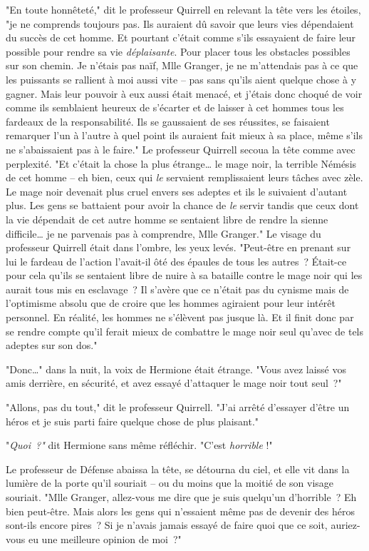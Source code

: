"En toute honnêteté," dit le professeur Quirrell en relevant la tête vers les étoiles, "je ne comprends toujours pas. Ils auraient dû savoir que leurs vies dépendaient du succès de cet homme. Et pourtant c'était comme s'ils essayaient de faire leur possible pour rendre sa vie \emph{déplaisante}. Pour placer tous les obstacles possibles sur son chemin. Je n'étais pas naïf, Mlle Granger, je ne m'attendais pas à ce que les puissants se rallient à moi aussi vite -- pas sans qu'ils aient quelque chose à y gagner. Mais leur pouvoir à eux aussi était menacé, et j'étais donc choqué de voir comme ils semblaient heureux de s'écarter et de laisser à cet hommes tous les fardeaux de la responsabilité. Ils se gaussaient de ses réussites, se faisaient remarquer l'un à l'autre à quel point ils auraient fait mieux à sa place, même s'ils ne s'abaissaient pas à le faire." Le professeur Quirrell secoua la tête comme avec perplexité. "Et c'était la chose la plus étrange… le mage noir, la terrible Némésis de cet homme -- eh bien, ceux qui \emph{le} servaient remplissaient leurs tâches avec zèle. Le mage noir devenait plus cruel envers ses adeptes et ils le suivaient d'autant plus. Les gens se battaient pour avoir la chance de \emph{le} servir tandis que ceux dont la vie dépendait de cet autre homme se sentaient libre de rendre la sienne difficile… je ne parvenais pas à comprendre, Mlle Granger." Le visage du professeur Quirrell était dans l'ombre, les yeux levés. "Peut-être en prenant sur lui le fardeau de l'action l'avait-il ôté des épaules de tous les autres~? Était-ce pour cela qu'ils se sentaient libre de nuire à sa bataille contre le mage noir qui les aurait tous mis en esclavage~? Il s'avère que ce n'était pas du cynisme mais de l'optimisme absolu que de croire que les hommes agiraient pour leur intérêt personnel. En réalité, les hommes ne s'élèvent pas jusque là. Et il finit donc par se rendre compte qu'il ferait mieux de combattre le mage noir seul qu'avec de tels adeptes sur son dos."

"Donc…" dans la nuit, la voix de Hermione était étrange. "Vous avez laissé vos amis derrière, en sécurité, et avez essayé d'attaquer le mage noir tout seul~?"

"Allons, pas du tout," dit le professeur Quirrell. "J'ai arrêté d'essayer d'être un héros et je suis parti faire quelque chose de plus plaisant."

"\emph{Quoi~?"} dit Hermione sans même réfléchir. "C'est \emph{horrible} !"

Le professeur de Défense abaissa la tête, se détourna du ciel, et elle vit dans la lumière de la porte qu'il souriait -- ou du moins que la moitié de son visage souriait. "Mlle Granger, allez-vous me dire que je suis quelqu'un d'horrible~? Eh bien peut-être. Mais alors les gens qui n'essaient même pas de devenir des héros sont-ils encore pires~? Si je n'avais jamais essayé de faire quoi que ce soit, auriez-vous eu une meilleure opinion de moi~?"

